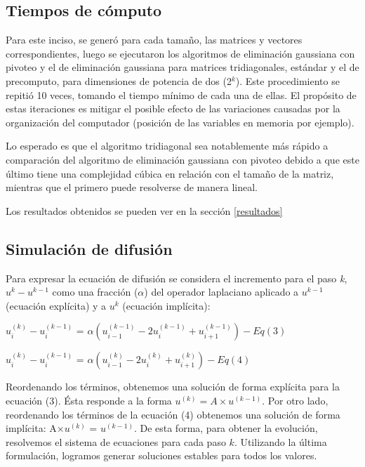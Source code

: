 \subsection{Tiempos de cómputo}
Para este inciso, se generó para cada tamaño, las matrices y vectores correspondientes, luego se ejecutaron los algoritmos de eliminación gaussiana con pivoteo y el de eliminación gaussiana para matrices tridiagonales, estándar y el de precomputo, para dimensiones de potencia de dos (2$^k$). Este procedimiento se repitió 10 veces, tomando el tiempo mínimo de cada una de ellas. El propósito de estas iteraciones es mitigar el posible efecto de las variaciones causadas por la organización del computador (posición de las variables en memoria por ejemplo).

Lo esperado es que el algoritmo tridiagonal sea notablemente más rápido a comparación del algoritmo de eliminación gaussiana con pivoteo debido a que este último tiene una complejidad cúbica en relación con el tamaño de la matriz, mientras que el primero puede resolverse de manera lineal.

Los resultados obtenidos se pueden ver en la sección \ref{resultados}


\subsection{Simulación de difusión}

Para expresar la ecuación de difusión se considera el incremento para el paso \textit{k}, $u^k - u^{k-1}$ como una
fracción ($\alpha$) del operador laplaciano aplicado a $u^{k-1}$ (ecuación explícita) y a $u^{k}$ (ecuación implícita):
\begin{center}
  $u_i^{(k)} - u_i^{(k-1)}$ = $\alpha(u_{i-1}^{(k-1)} - 2u_i^{(k-1)} + u_{i+1}^{(k-1)}) - Eq (3)$
\end{center}

\begin{center}
  $u_i^{(k)} - u_i^{(k-1)}$ = $\alpha(u_{i-1}^{(k)} - 2u_i^{(k)} + u_{i+1}^{(k)}) - Eq (4)$
\end{center}

Reordenando los términos, obtenemos una solución de forma explícita para la ecuación (3). Ésta responde a la forma $u^{(k)} = A \times u^{(k-1)}$. Por otro lado, reordenando los términos de la ecuación (4) obtenemos una solución de forma implícita: A$\times u^{(k)}$ = $u^{(k-1)}$. De esta forma, para obtener la evolución, resolvemos el sistema de ecuaciones para cada paso $k$.
Utilizando la última formulación, logramos generar soluciones estables para todos los valores.

